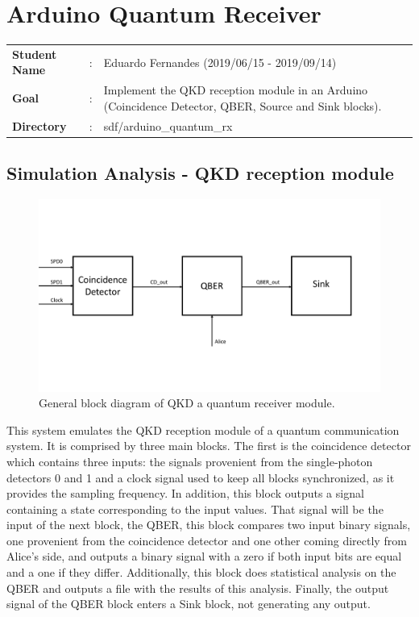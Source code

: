 \clearpage
\section{Arduino Quantum Receiver}

\begin{refsection}

\begin{tcolorbox}	
\begin{tabular}{p{2.75cm} p{0.2cm} p{10.5cm}} 	
\textbf{Student Name}  &:&  Eduardo Fernandes (2019/06/15 - 2019/09/14)\\
\textbf{Goal}          &:& Implement the QKD reception module in an Arduino (Coincidence Detector, QBER, Source and Sink blocks).\\
\textbf{Directory}              &:& sdf/arduino\_quantum\_rx
\end{tabular}
\end{tcolorbox}


\subsection{Simulation Analysis - QKD reception module}

\begin{figure}[H]
	\centering
	\includegraphics[width=1\linewidth]{./sdf/arduino_quantum_rx/figures/generalDiagram.pdf}
	\caption{General block diagram of QKD a quantum receiver module.}
	\label{fig:arduino}
\end{figure}

This system emulates the QKD reception module of a quantum communication system. It is comprised by three main blocks. The first is the coincidence detector  which contains three inputs: the signals provenient from the single-photon detectors 0 and 1 and a clock signal used to keep all blocks synchronized, as it provides the sampling frequency. In addition, this block outputs a signal containing a state corresponding to the input values. That signal will be the input of the next block, the QBER, this block compares two input binary signals, one provenient from the coincidence detector and one other coming directly from Alice's side, and outputs a binary signal with a zero if both input bits are equal and a one if they differ. Additionally, this block does statistical analysis on the QBER and outputs a file with the results of this analysis. Finally, the output signal of the QBER block enters a Sink block, not generating any output. 


\end{refsection}
